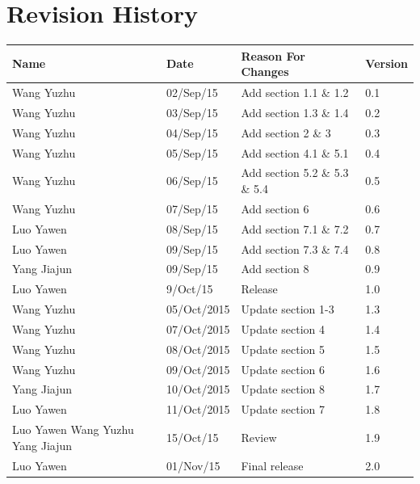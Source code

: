 \documentclass[11pt, a4paper]{article}
\begin{document}
\section*{Revision History}
\small
\begin{tabular} 
	 {|m{3cm}|m{2cm}|m{8cm}|m{2cm}|}
	\hline
	\textbf{Name} &  \textbf{Date} & \textbf{Reason For Changes} & \textbf{Version} \\ [0.5ex]
	\hline
	Wang Yuzhu & 02/Sep/15 & Add section 1.1 \& 1.2 & 0.1 \\ [0.5ex]
	\hline
	Wang Yuzhu & 03/Sep/15 & Add section 1.3 \& 1.4 & 0.2 \\ [0.5ex]
	\hline
	Wang Yuzhu & 04/Sep/15 & Add section 2 \& 3 & 0.3 \\ [0.5ex]
	\hline
	Wang Yuzhu & 05/Sep/15 & Add section 4.1 \& 5.1 & 0.4 \\ [0.5ex]
	\hline
	Wang Yuzhu & 06/Sep/15 & Add section 5.2 \& 5.3 \& 5.4 & 0.5 \\ [0.5ex]
	\hline
        Wang Yuzhu & 07/Sep/15 & Add section 6 & 0.6 \\ [0.5ex]
	\hline
	Luo Yawen & 08/Sep/15 & Add section 7.1 \& 7.2 & 0.7 \\ [0.5ex]
	\hline
	Luo Yawen & 09/Sep/15 & Add section 7.3 \& 7.4  & 0.8 \\ [0.5ex]
	\hline
	Yang Jiajun & 09/Sep/15 & Add section 8 & 0.9 \\ [0.5ex]
	\hline
	Luo Yawen & 9/Oct/15 & Release & 1.0 \\ [0.5ex]
	\hline
	Wang Yuzhu & 05/Oct/2015 & Update section 1-3 & 1.3 \\ [0.5ex]
	\hline
	Wang Yuzhu & 07/Oct/2015 & Update section 4 & 1.4 \\ [0.5ex]
	\hline
	Wang Yuzhu & 08/Oct/2015 & Update section 5 & 1.5\\ [0.5ex]
	\hline
	Wang Yuzhu & 09/Oct/2015 & Update section 6 & 1.6 \\  [0.5ex]
	\hline
	Yang Jiajun & 10/Oct/2015 & Update section 8 & 1.7 \\ [0.5ex]
	\hline
	Luo Yawen & 11/Oct/2015 & Update section 7 & 1.8\\ [0.5ex]
	\hline
	Luo Yawen \newline  Wang Yuzhu \newline Yang Jiajun & 15/Oct/15 & Review & 1.9 \\ [0.5ex]
	\hline
	Luo Yawen & 01/Nov/15 & Final release & 2.0 \\ [0.5ex]
	\hline
		
\end{tabular}
\cleardoublepage
\end{document}
